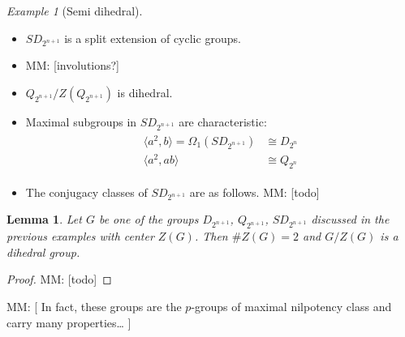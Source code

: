 \documentclass{dcthesis}
\newcommand{\mm}[1]{{\color{blue} \sf MM: [#1]}}
\numberwithin{equation}{section}
\newtheorem{lemma}[equation]{Lemma}
\theoremstyle{definition}
\theoremstyle{remark}
\newtheorem{example}[equation]{Example}
\begin{document}
{{\begin{example}[Semi dihedral]
\begin{itemize}
          \mm{todo}
        \item
          $SD_{2^{n+1}}$ is a split extension
          of cyclic groups.
        \item
          \mm{involutions?}
        \item
          $Q_{2^{n+1}}/Z(Q_{2^{n+1}})$ is dihedral.
        \item
          Maximal subgroups in $SD_{2^{n+1}}$ are characteristic:
          \begin{align}
            \label{eqn:maximalsubgroupssemidihedral}
            \begin{split}
              \langle a^2,b\rangle=\Omega_1(SD_{2^{n+1}})&\cong D_{2^n}\\
              \langle a^2,ab\rangle&\cong Q_{2^n}
            \end{split}
          \end{align}
        \item
          The conjugacy classes of
          $SD_{2^{n+1}}$ are as follows.
          \mm{todo}
      \end{itemize}
    \end{example}
    \begin{lemma}
      \label{lem:dihedralquotient}
      Let $G$ be one of the groups
      $D_{2^{n+1}}$, $Q_{2^{n+1}}$, $SD_{2^{n+1}}$
      discussed in the previous examples
      with center $Z(G)$.
      Then $\#Z(G) = 2$
      and $G/Z(G)$ is a dihedral group.
    \end{lemma}
    \begin{proof}
      \mm{todo}
    \end{proof}
    \mm{
      In fact, these groups are the $p$-groups
      of maximal nilpotency class and carry
      many properties\ldots
    }
  }
}
\end{document}
